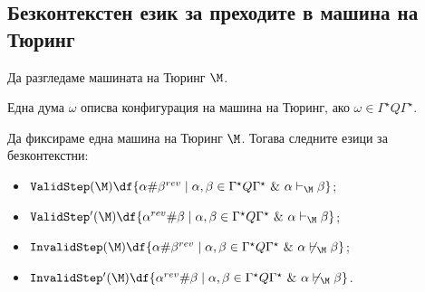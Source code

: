 
\subsection*{Безконтекстен език за преходите в машина на Тюринг}

Да разгледаме машината на Тюринг $\M$.

Една дума $\omega$ описва конфигурация на машина на Тюринг,
ако $\omega \in \Gamma^\star Q \Gamma^\star$.

\begin{framed}
  \begin{prop}
    Да фиксираме една машина на Тюринг $\M$. 
    Тогава следните езици за безконтекстни:
    \begin{itemize}
    \item 
      $\texttt{ValidStep}(\M) \df \{\alpha\#\beta^{rev} \mid \alpha,\beta \in \Gamma^\star Q \Gamma^\star\ \&\ \alpha \vdash_\M \beta\}$;
    \item
      $\texttt{ValidStep}'(\M)\df \{\alpha^{rev}\#\beta \mid \alpha,\beta \in \Gamma^\star Q \Gamma^\star\ \&\ \alpha \vdash_\M \beta\}$;
    \item
      $\texttt{InvalidStep}(\M) \df \{\alpha\#\beta^{rev} \mid \alpha,\beta \in \Gamma^\star Q \Gamma^\star\ \&\  \alpha \not\vdash_\M \beta\}$;
    \item
      $\texttt{InvalidStep}'(\M) \df \{\alpha^{rev}\#\beta \mid \alpha,\beta \in \Gamma^\star Q \Gamma^\star\ \&\ \alpha \not\vdash_\M \beta\}$.
    \end{itemize}
  \end{prop}  
\end{framed}

